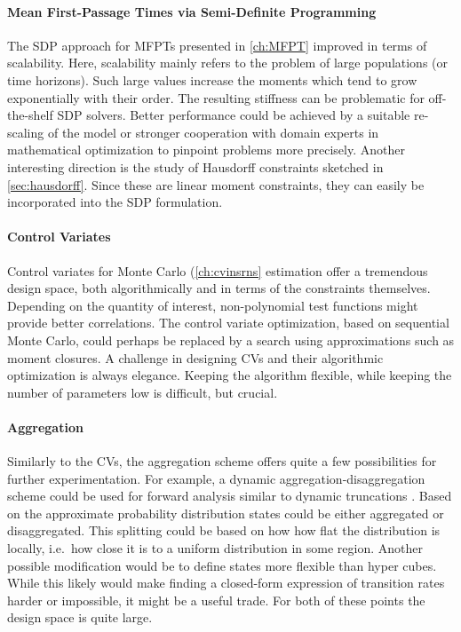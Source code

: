 \paragraph{Mean First-Passage Times via Semi-Definite Programming}
The \ac{SDP} approach for \acp{MFPT} presented in \autoref{ch:MFPT} improved in terms of scalability.
Here, scalability mainly refers to the problem of large populations (or time horizons).
Such large values increase the moments which tend to grow exponentially with their order.
The resulting stiffness can be problematic for off-the-shelf \ac{SDP} solvers.
Better performance could be achieved by a suitable re-scaling of the model or stronger cooperation with domain experts in mathematical optimization to pinpoint problems more precisely.
Another interesting direction is the study of Hausdorff constraints sketched in \autoref{sec:hausdorff}.
Since these are linear moment constraints, they can easily be incorporated into the \ac{SDP} formulation.

\paragraph{Control Variates}
Control variates for Monte Carlo (\autoref{ch:cvinsrns} estimation offer a tremendous design space, both algorithmically and in terms of the constraints themselves.
Depending on the quantity of interest, non-polynomial test functions might provide better correlations.
The control variate optimization, based on sequential Monte Carlo, could perhaps be replaced by a search using approximations such as moment closures.
A challenge in designing \acp{CV} and their algorithmic optimization is always elegance.
Keeping the algorithm flexible, while keeping the number of parameters low is difficult, but crucial.

\paragraph{Aggregation}
Similarly to the \aclp{CV}, the aggregation scheme offers quite a few possibilities for further experimentation.
For example, a dynamic aggregation-disaggregation scheme could be used for forward analysis similar to dynamic truncations \parencite{andreychenko2011parameter}.
Based on the approximate probability distribution states could be either aggregated or disaggregated.
This splitting could be based on how how flat the distribution is locally, i.e.\ how close it is to a uniform distribution in some region.
Another possible modification would be to define states more flexible than hyper cubes.
While this likely would make finding a closed-form expression of transition rates harder or impossible, it might be a useful trade.
For both of these points the design space is quite large.

